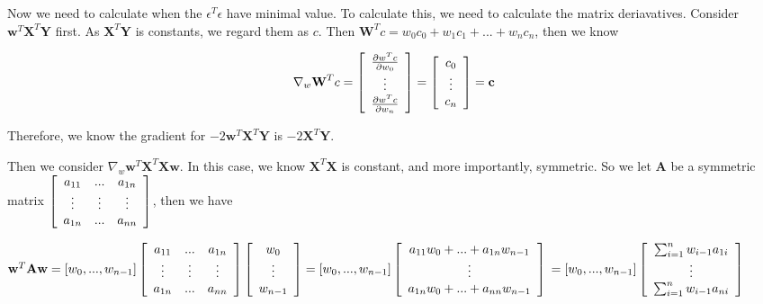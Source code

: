 \documentclass{article}
\theoremstyle{definition}
\begin{document}
Now we need to calculate when the $\epsilon^{T}\epsilon$ have minimal value. To calculate this, we need to calculate the matrix deriavatives. Consider $\textbf{w}^{T}\textbf{X}^{T}\textbf{Y}$ first. As $\textbf{X}^{T}\textbf{Y}$ is constants, we regard them as $c$. Then $\textbf{W}^{T}c=w_0c_0+w_1c_1+...+w_nc_n$, then we know 

$$\nabla_w \textbf{W}^{T}c=\left[ {\begin{array}{*{20}c}
   \frac{\partial w^{T}c}{\partial w_0} \\
   \vdots \\ 
   \frac{\partial w^{T}c}{\partial w_n} \\
 \end{array} } \right] = \left[ {\begin{array}{*{20}c}
   c_0 \\
   \vdots \\ 
   c_n \\
 \end{array} } \right] = \textbf{c}$$

Therefore, we know the gradient for $-2\textbf{w}^{T}\textbf{X}^{T}\textbf{Y}$ is $-2\textbf{X}^{T}\textbf{Y}$.

Then we consider $\nabla_w \textbf{w}^{T}\textbf{X}^{T}\textbf{X}\textbf{w}$. In this case, we know $\textbf{X}^{T}\textbf{X}$ is constant, and more importantly, symmetric. So we let $\textbf{A}$ be a symmetric matrix $\left[ {\begin{array}{*{20}c}
   a_{11} & ...  & a_{1n}\\
   \vdots  & \vdots & \vdots \\
   a_{1n} & ... &a_{nn}\\
 \end{array} } \right]$, then we have 
 
 $\textbf{w}^{T}\textbf{A}\textbf{w}=[w_0, ..., w_{n-1}]\left[ {\begin{array}{*{20}c}
   a_{11} & ...  & a_{1n}\\
   \vdots  & \vdots & \vdots \\
   a_{1n} & ... &a_{nn}\\
 \end{array} } \right] \left[ {\begin{array}{*{20}c}
   w_{0} \\
   \vdots \\
   w_{n-1} \\
 \end{array} } \right]=[w_0, ..., w_{n-1}]\left[ {\begin{array}{*{20}c}
   a_{11}w_0 + ... + a_{1n}w_{n-1}\\
   \vdots \\
   a_{1n}w_0 + ... + a_{nn}w_{n-1}\\
 \end{array} } \right] \\
 =[w_0, ..., w_{n-1}]\left[ {\begin{array}{*{20}c}
   \sum_{i=1}^{n}w_{i-1}a_{1i}\\
   \vdots \\
   \sum_{i=1}^{n}w_{i-1}a_{ni}\\
 \end{array} } \right]$
 
\end{document}
